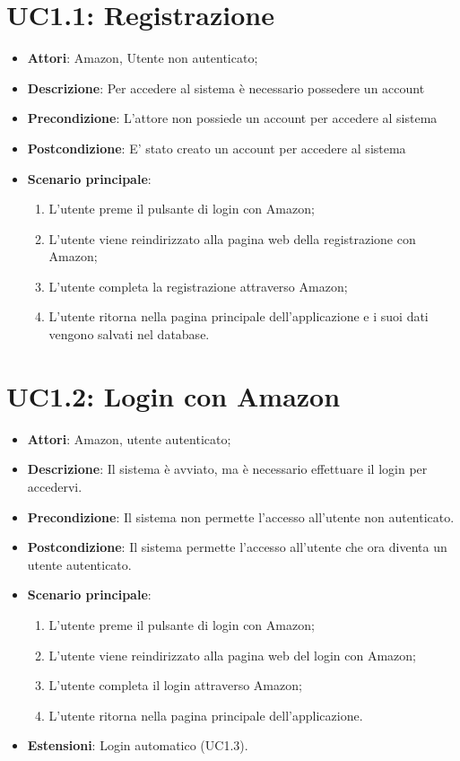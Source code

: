 \section{UC1.1: Registrazione}
\label{UC1.1}
\begin{itemize}
	\item \textbf{Attori}: Amazon, Utente non autenticato;
	\item \textbf{Descrizione}: Per accedere al sistema è necessario possedere un account
	\item \textbf{Precondizione}: L'attore non possiede un account per accedere al sistema
	\item \textbf{Postcondizione}: E' stato creato un account per accedere al sistema
	\item \textbf{Scenario principale}:
	\begin{enumerate} \item L'utente preme il pulsante di login con Amazon;  \item  L'utente viene reindirizzato alla pagina web della registrazione con Amazon;  \item 
		L'utente completa la registrazione attraverso Amazon;  \item  L'utente ritorna nella pagina principale dell'applicazione e i suoi dati vengono salvati nel database.\end{enumerate}
\end{itemize}

\section{UC1.2: Login con Amazon}
\label{UC1.2}
\begin{itemize}
	\item \textbf{Attori}: Amazon, utente autenticato;
	\item \textbf{Descrizione}: Il sistema è avviato, ma è necessario effettuare il login per accedervi.
	\item \textbf{Precondizione}: Il sistema non permette l'accesso all'utente non autenticato.
	\item \textbf{Postcondizione}: Il sistema permette l'accesso all'utente che ora diventa un utente autenticato.
	\item \textbf{Scenario principale}:
	\begin{enumerate} \item L'utente preme il pulsante di login con Amazon;  \item  L'utente viene reindirizzato alla pagina web del login con Amazon;  \item 
		L'utente completa il login attraverso Amazon;  \item  L'utente ritorna nella pagina principale dell'applicazione.\end{enumerate}
	\item \textbf{Estensioni}:
	Login automatico (UC1.3).
\end{itemize}

